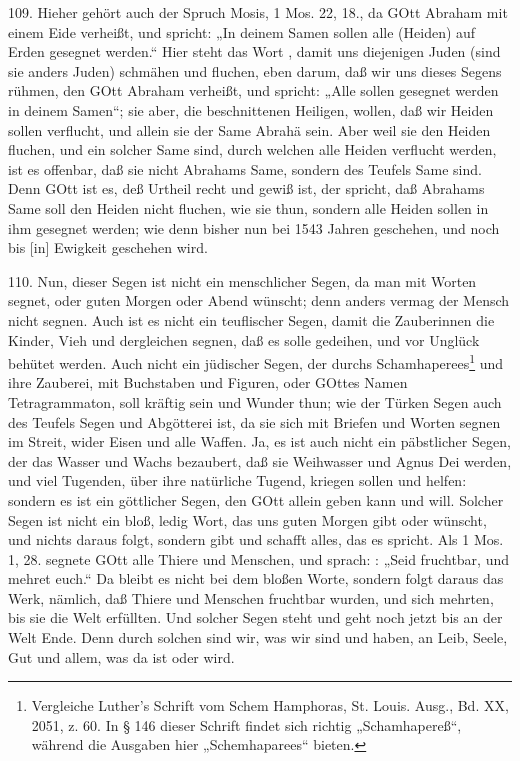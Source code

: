 109. Hieher gehört auch der Spruch Mosis, 1 Mos. 22, 18., da GOtt Abraham mit einem Eide verheißt, und spricht: „In deinem Samen sollen alle  (Heiden) auf Erden gesegnet werden.“ Hier steht das Wort , damit uns diejenigen Juden (sind sie anders Juden) schmähen und fluchen, eben darum, daß wir uns dieses Segens rühmen, den GOtt Abraham verheißt, und spricht: „Alle  sollen gesegnet werden in deinem Samen“; sie aber, die beschnittenen Heiligen, wollen, daß wir Heiden sollen verflucht, und allein sie der Same Abrahä sein. Aber weil sie den Heiden fluchen, und ein solcher Same sind, durch welchen alle Heiden verflucht werden, ist es offenbar, daß sie nicht Abrahams Same, sondern des Teufels Same sind. Denn GOtt ist es, deß Urtheil recht und gewiß ist, der spricht, daß Abrahams Same soll den Heiden nicht fluchen, wie sie thun, sondern alle Heiden sollen in ihm gesegnet werden; wie denn bisher nun bei 1543 Jahren geschehen, und noch bis [in] Ewigkeit geschehen wird.

110. Nun, dieser Segen ist nicht ein menschlicher Segen, da man mit Worten segnet, oder guten Morgen oder Abend wünscht; denn anders vermag der Mensch nicht segnen. Auch ist es nicht ein teuflischer Segen, damit die Zauberinnen die Kinder, Vieh und dergleichen segnen, daß es solle gedeihen, und vor Unglück behütet werden. Auch nicht ein jüdischer Segen, der durchs Schamhaperees\footnote{Vergleiche Luther's Schrift vom Schem Hamphoras, St. Louis. Ausg., Bd. XX, 2051, z. 60. In § 146 dieser Schrift findet sich richtig „Schamhapereß“, während die Ausgaben hier „Schemhaparees“ bieten.} und ihre Zauberei, mit Buchstaben und Figuren, oder GOttes Namen Tetragrammaton, soll kräftig sein und Wunder thun; wie der Türken Segen auch des Teufels Segen und Abgötterei ist, da sie sich mit Briefen und Worten segnen im Streit, wider Eisen und alle Waffen. Ja, es ist auch nicht ein päbstlicher Segen, der das Wasser und Wachs bezaubert, daß sie Weihwasser und Agnus Dei werden, und viel Tugenden, über ihre natürliche Tugend, kriegen sollen und helfen: sondern es ist ein göttlicher Segen, den GOtt allein geben kann und will. Solcher Segen ist nicht ein bloß, ledig Wort, das uns guten Morgen gibt oder wünscht, und nichts daraus folgt, sondern gibt und schafft alles, das es spricht. Als 1 Mos. 1, 28. segnete GOtt alle Thiere und Menschen, und sprach: : „Seid fruchtbar, und mehret euch.“ Da bleibt es nicht bei dem bloßen Worte, sondern folgt daraus das Werk, nämlich, daß Thiere und Menschen fruchtbar wurden, und sich mehrten, bis sie die Welt erfüllten. Und solcher Segen steht und geht noch jetzt bis an der Welt Ende. Denn durch solchen sind wir, was wir sind und haben, an Leib, Seele, Gut und allem, was da ist oder wird.

